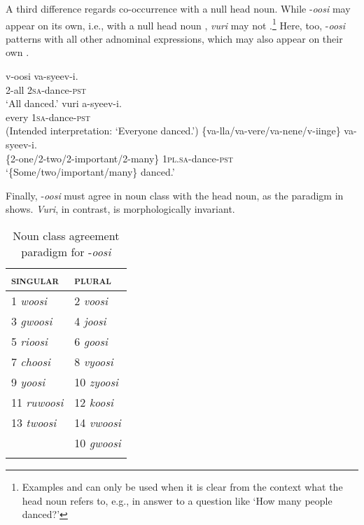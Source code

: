 \documentclass[output=paper]{langsci/langscibook}
\begin{document}
A third difference regards co-occurrence with a null head noun. While -\textit{oosi} may appear on its own, i.e., with a null head noun , \textit{vuri} may not .\footnote{Examples  and  can only be used when it is clear from the context what the head noun refers to, e.g., in answer to a question like ‘How many people danced?’} Here, too, -\textit{oosi} patterns with all other adnominal expressions, which may also appear on their own .

\ea\label{ex:landman:13}
\ea\label{ex:landman:13a}
\gll v-oosi    va-syeev-i.      \\
     2-all    2\textsc{sa}-dance-\textsc{pst}\\
\glt ‘All danced.’
\ex\label{ex:landman:13b}
\gll *vuri    a-syeev-i.  \\
     every    1\textsc{sa}-dance-\textsc{pst}\\
\glt (Intended interpretation: ‘Everyone danced.’)
\ex\label{ex:landman:13c}
\gll \{va-lla/va-vere/va-nene/v-iinge\}  va-syeev-i.\\
     \{2-one/2-two/2-important/2-many\}  1\textsc{pl}.\textsc{sa}-dance-\textsc{pst}\\
\glt ‘\{Some/two/important/many\} danced.’
\z
\z

  Finally, -\textit{oosi} must agree in noun class with the head noun, as the paradigm in  shows. \textit{Vuri}, in contrast, is morphologically invariant.

\begin{table}
\caption{Noun class agreement paradigm for -\textit{oosi}}
\label{tab:Landman:1}
\begin{tabularx}{.5\textwidth}{XX}
\lsptoprule
\textsc{singular} & \textsc{plural}\\
\midrule
1  \textit{woosi} & 2  \textit{voosi}\\

3  \textit{gwoosi} & 4  \textit{joosi}\\

5  \textit{rioosi} & 6  \textit{goosi}\\

7  \textit{choosi} & 8  \textit{vyoosi} \\

9  \textit{yoosi} & 10  \textit{zyoosi} \\

11  \textit{ruwoosi} & 12  \textit{koosi}\\

13  \textit{twoosi} & 14  \textit{vwoosi}\\

& 10  \textit{gwoosi}\\
\lspbottomrule
\end{tabularx}
\end{table}
\end{document}
